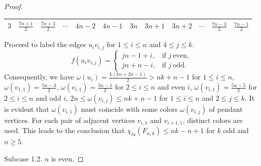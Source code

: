 \documentclass[12pt]{article}
\begin{document}
\begin{proof}
\begin{table}[htbp]
\begin{tabular}{|c|c|c|c|c|c|c|c|c|c|c|c|c|c|}
$3$ &$\frac{7n+1}{2}$ &$\frac{7n+3}{2}$ &\multicolumn{2}{c|}{$\cdots$} &$4n-2$ &$4n-1$ &$3n$
   &$3n+1$  &$3n+2$
&\multicolumn{2}{c|}{$\cdots$} &$\frac{7n-3}{2}$ &$\frac{7n-1}{2}$\\\hline
\end{tabular}
\end{table}

\noindent Proceed to label the edges $u_{i}v_{i,j}$ for $1\leq i\leq n$ and $4\leq j\leq k$.
\begin{equation*}
f(u_{i}v_{i,j})=\left\{\begin{array}{ll}
jn-1+i, &\text{if } j~\text{even},\\[1pt]
jn+n-i, &\text{if } j~\text{odd}.
\end{array}\right.
\end{equation*}
Consequently, we have $\omega(u_{i})=\frac{k(kn+2n-1)}{2}>nk+n-1$ for $1\leq i\leq n$,  $\omega(v_{1,1})=\frac{5n-3}{2}$,  $\omega(v_{i,1})=\frac{5n-1}{2}$ for $2\leq i\leq n$ and even $i$, $\omega(v_{i,1})=\frac{5n-5}{2}$ for $2\leq i\leq n$ and odd $i$,  $2n\leq\omega(v_{i,j})\leq nk+n-1$ for $1\leq i\leq n$ and $2\leq j\leq k$.
It is evident that $\omega(v_{i,1})$ must coincide with some colors $\omega(v_{i,j})$ of pendant vertices. For each pair of adjacent vertices $v_{i,1}$ and $v_{i+1,1}$, distinct colors are used. This leads to the conclusion that $\chi_{la}(F_{n,k})\leq nk-n+1$ for $k$ odd and $n\geq 5$.



Subcase 1.2. $n$ is even.


\end{proof}
\end{document}
